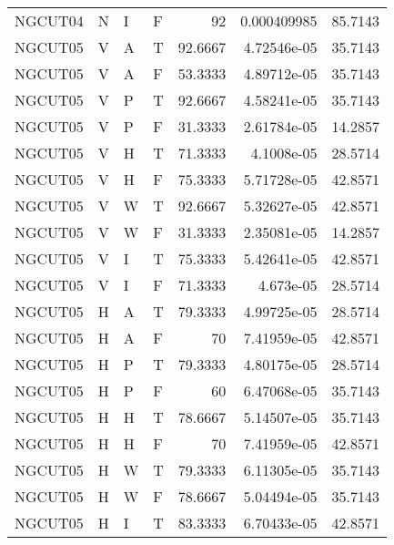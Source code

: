 \begin{longtable}{llllrrr}
    NGCUT04  & N         & I         & F          & 92         & 0.000409985 & 85.7143  \\
    NGCUT05  & V         & A         & T          & 92.6667    & 4.72546e-05 & 35.7143  \\
    NGCUT05  & V         & A         & F          & 53.3333    & 4.89712e-05 & 35.7143  \\
    NGCUT05  & V         & P         & T          & 92.6667    & 4.58241e-05 & 35.7143  \\
    NGCUT05  & V         & P         & F          & 31.3333    & 2.61784e-05 & 14.2857  \\
    NGCUT05  & V         & H         & T          & 71.3333    & 4.1008e-05  & 28.5714  \\
    NGCUT05  & V         & H         & F          & 75.3333    & 5.71728e-05 & 42.8571  \\
    NGCUT05  & V         & W         & T          & 92.6667    & 5.32627e-05 & 42.8571  \\
    NGCUT05  & V         & W         & F          & 31.3333    & 2.35081e-05 & 14.2857  \\
    NGCUT05  & V         & I         & T          & 75.3333    & 5.42641e-05 & 42.8571  \\
    NGCUT05  & V         & I         & F          & 71.3333    & 4.673e-05   & 28.5714  \\
    NGCUT05  & H         & A         & T          & 79.3333    & 4.99725e-05 & 28.5714  \\
    NGCUT05  & H         & A         & F          & 70         & 7.41959e-05 & 42.8571  \\
    NGCUT05  & H         & P         & T          & 79.3333    & 4.80175e-05 & 28.5714  \\
    NGCUT05  & H         & P         & F          & 60         & 6.47068e-05 & 35.7143  \\
    NGCUT05  & H         & H         & T          & 78.6667    & 5.14507e-05 & 35.7143  \\
    NGCUT05  & H         & H         & F          & 70         & 7.41959e-05 & 42.8571  \\
    NGCUT05  & H         & W         & T          & 79.3333    & 6.11305e-05 & 35.7143  \\
    NGCUT05  & H         & W         & F          & 78.6667    & 5.04494e-05 & 35.7143  \\
    NGCUT05  & H         & I         & T          & 83.3333    & 6.70433e-05 & 42.8571  \\

\end{longtable}
